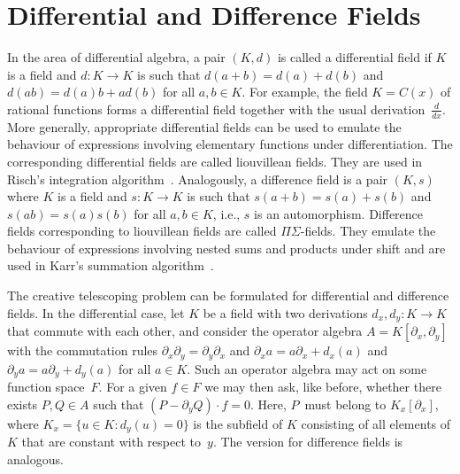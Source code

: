 \documentclass{jssc}
\begin{document}
 \section{Differential and Difference Fields}\label{sec:2}

 In the area of differential algebra, a pair $(K,d)$ is called a differential
 field if $K$ is a field and $d\colon K\to K$ is such that $d(a+b)=d(a)+d(b)$
 and $d(ab)=d(a)b+ad(b)$ for all $a,b\in K$. For example, the field $K=C(x)$ of
 rational functions forms a differential field together with the usual
 derivation~$\frac d{dx}$.  More generally, appropriate differential fields can
 be used to emulate the behaviour of expressions involving elementary functions
 under differentiation. The corresponding differential fields are called
 liouvillean fields. They are used in Risch's integration
 algorithm~\cite{risch69,risch70,bronstein97,bronstein98}. Analogously, a difference field is a pair $(K,s)$
 where $K$ is a field and $s\colon K\to K$ is such that $s(a+b)=s(a)+s(b)$ and
 $s(ab)=s(a)s(b)$ for all $a,b\in K$, i.e., $s$ is an automorphism. Difference
 fields corresponding to liouvillean fields are called $\Pi\Sigma$-fields.
 They emulate the behaviour of expressions involving nested
 sums and products under shift and are used in Karr's summation
 algorithm~\cite{karr81,karr85}.

 The creative telescoping problem can be formulated for differential and
 difference fields.  In the differential case, let $K$ be a field with two
 derivations $d_x,d_y\colon K\to K$ that commute with each other, and consider
 the operator algebra $A=K[\partial_x,\partial_y]$ with the commutation rules
 $\partial_x\partial_y=\partial_y\partial_x$ and $\partial_x a = a\partial_x +
 d_x(a)$ and $\partial_y a = a\partial_y + d_y(a)$ for all $a\in K$. Such an
 operator algebra may act on some function space~$F$. For a given $f\in F$ we
 may then ask, like before, whether there exists $P,Q\in A$ such that
 $(P-\partial_yQ)\cdot f=0$. Here, $P$~must belong to $K_x[\partial_x]$, where
 $K_x=\{u\in K:d_y(u)=0\}$ is the subfield of $K$ consisting of all elements of
 $K$ that are constant with respect to~$y$. The version for difference fields
 is analogous.
\end{document}
